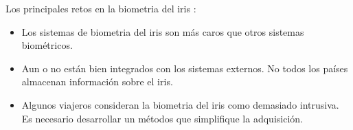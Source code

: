 Los principales retos en la \gls{biometria} del \gls{iris} \cite{palmer2012ten}:

\begin{itemize}
    \item 
    Los sistemas de \gls{biometria} del \gls{iris} son más caros que otros sistemas biométricos.
    
    \item
    Aun o no están bien integrados con los sistemas externos. No todos los países almacenan información sobre el iris.
    
    \item
    Algunos viajeros consideran la \gls{biometria} del \gls{iris} como demasiado intrusiva. Es necesario desarrollar un métodos que simplifique la adquisición.
\end{itemize}

\color{black}


